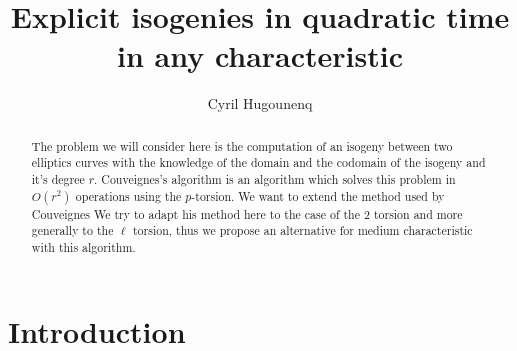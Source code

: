 \documentclass{lms}
\title[Explicit isogenies in any characteristic]{Explicit isogenies in quadratic time in any characteristic}
\author{Cyril Hugounenq}
\begin{document}
\maketitle

\begin{abstract}
The problem we will consider here is the computation of an isogeny between two elliptics curves with the knowledge of the domain and the codomain of the isogeny and it's degree $r$. Couveignes's algorithm is an algorithm which solves this problem in $O(r^2)$ operations using the $p$-torsion. We want to extend the method used by Couveignes  We try to adapt his method here to the case of the $2$ torsion and more generally to the $\ell$ torsion, thus we propose an alternative for medium characteristic with this algorithm.
\end{abstract}





\section{Introduction}
\label{sec:introduction}
\end{document}
